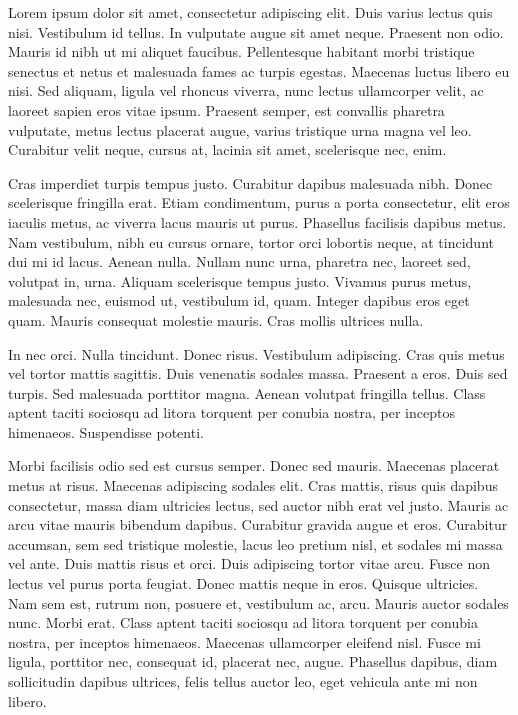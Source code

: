 Lorem ipsum dolor sit amet, consectetur adipiscing elit. Duis varius lectus quis nisi. Vestibulum id tellus. In vulputate augue sit amet neque. Praesent non odio. Mauris id nibh ut mi aliquet faucibus. Pellentesque habitant morbi tristique senectus et netus et malesuada fames ac turpis egestas. Maecenas luctus libero eu nisi. Sed aliquam, ligula vel rhoncus viverra, nunc lectus ullamcorper velit, ac laoreet sapien eros vitae ipsum. Praesent semper, est convallis pharetra vulputate, metus lectus placerat augue, varius tristique urna magna vel leo. Curabitur velit neque, cursus at, lacinia sit amet, scelerisque nec, enim.

Cras imperdiet turpis tempus justo. Curabitur dapibus malesuada nibh. Donec scelerisque fringilla erat. Etiam condimentum, purus a porta consectetur, elit eros iaculis metus, ac viverra lacus mauris ut purus. Phasellus facilisis dapibus metus. Nam vestibulum, nibh eu cursus ornare, tortor orci lobortis neque, at tincidunt dui mi id lacus. Aenean nulla. Nullam nunc urna, pharetra nec, laoreet sed, volutpat in, urna. Aliquam scelerisque tempus justo. Vivamus purus metus, malesuada nec, euismod ut, vestibulum id, quam. Integer dapibus eros eget quam. Mauris consequat molestie mauris. Cras mollis ultrices nulla.

In nec orci. Nulla tincidunt. Donec risus. Vestibulum adipiscing. Cras quis metus vel tortor mattis sagittis. Duis venenatis sodales massa. Praesent a eros. Duis sed turpis. Sed malesuada porttitor magna. Aenean volutpat fringilla tellus. Class aptent taciti sociosqu ad litora torquent per conubia nostra, per inceptos himenaeos. Suspendisse potenti.

Morbi facilisis odio sed est cursus semper. Donec sed mauris. Maecenas placerat metus at risus. Maecenas adipiscing sodales elit. Cras mattis, risus quis dapibus consectetur, massa diam ultricies lectus, sed auctor nibh erat vel justo. Mauris ac arcu vitae mauris bibendum dapibus. Curabitur gravida augue et eros. Curabitur accumsan, sem sed tristique molestie, lacus leo pretium nisl, et sodales mi massa vel ante. Duis mattis risus et orci. Duis adipiscing tortor vitae arcu. Fusce non lectus vel purus porta feugiat. Donec mattis neque in eros. Quisque ultricies. Nam sem est, rutrum non, posuere et, vestibulum ac, arcu. Mauris auctor sodales nunc. Morbi erat. Class aptent taciti sociosqu ad litora torquent per conubia nostra, per inceptos himenaeos. Maecenas ullamcorper eleifend nisl. Fusce mi ligula, porttitor nec, consequat id, placerat nec, augue. Phasellus dapibus, diam sollicitudin dapibus ultrices, felis tellus auctor leo, eget vehicula ante mi non libero.

